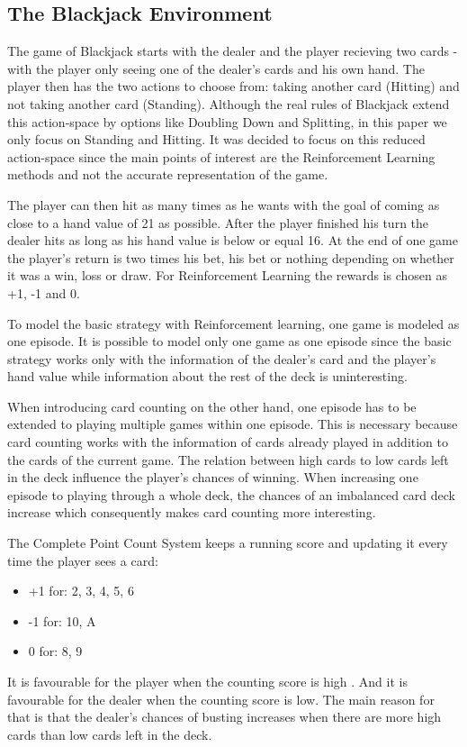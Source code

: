 \documentclass[conference]{IEEEtran}
\begin{document}
\subsection{The Blackjack Environment}
The game of Blackjack starts with the dealer and the player recieving two cards - with the player only seeing one of the dealer's cards and his own hand.
The player then has the two actions to choose from: taking another card (Hitting) and not taking another card (Standing). 
Although the real rules of Blackjack extend this action-space by options like Doubling Down and Splitting, in this paper we only focus on Standing and Hitting. 
It was decided to focus on this reduced action-space since the main points of interest are the Reinforcement Learning methods and not the accurate representation of the game. 

The player can then hit as many times as he wants with the goal of coming as close to a hand value of 21 as possible.
After the player finished his turn the dealer hits as long as his hand value is below or equal 16.
At the end of one game the player's return is two times his bet, his bet or nothing depending on whether it was a win, loss or draw. 
For Reinforcement Learning the rewards is chosen as +1, -1 and 0. 

To model the basic strategy with Reinforcement learning, one game is modeled as one episode. 
It is possible to model only one game as one episode since the basic strategy works only with the information of the dealer's card and the player's hand value while information about the rest of the deck is uninteresting.

When introducing card counting on the other hand, one episode has to be extended to playing multiple games within one episode. 
This is necessary because card counting works with the information of cards already played in addition to the cards of the current game.
The relation between high cards to low cards left in the deck influence the player's chances of winning.
When increasing one episode to playing through a whole deck, the chances of an imbalanced card deck increase which consequently makes card counting more interesting. 

The Complete Point Count System \cite{b1} keeps a running score and updating it every time the player sees a card:
\begin{itemize}
	\item +1 for: 2, 3, 4, 5, 6
	\item -1 for: 10, A
	\item 0 for: 8, 9 
\end{itemize}
It is favourable for the player when the counting score is high \cite{b1}.
And it is favourable for the dealer when the counting score is low.
The main reason for that is that the dealer's chances of busting increases when there are more high cards than low cards left in the deck.
\end{document}

